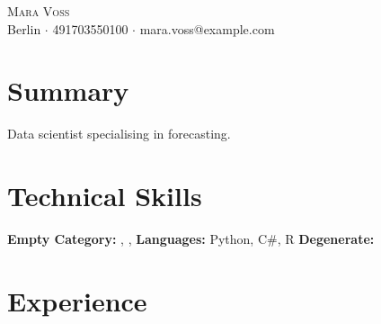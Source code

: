 \documentclass[letterpaper,11pt]{article}
\begin{document}
\begin{center}
{\Huge \scshape Mara Voss} \\ \vspace{5pt}
\small Berlin $\cdot$ 491703550100 $\cdot$ mara.voss@example.com
\end{center}

\section{Summary}
{\small Data scientist specialising in forecasting.}

\section{Technical Skills}
\begin{itemize}
    \small{\item{
     \textbf{Empty Category:} , , 
     \textbf{Languages:} Python, C\#, R
     \textbf{Degenerate:}
    }}
\end{itemize}

\section{Experience}
\end{document}
